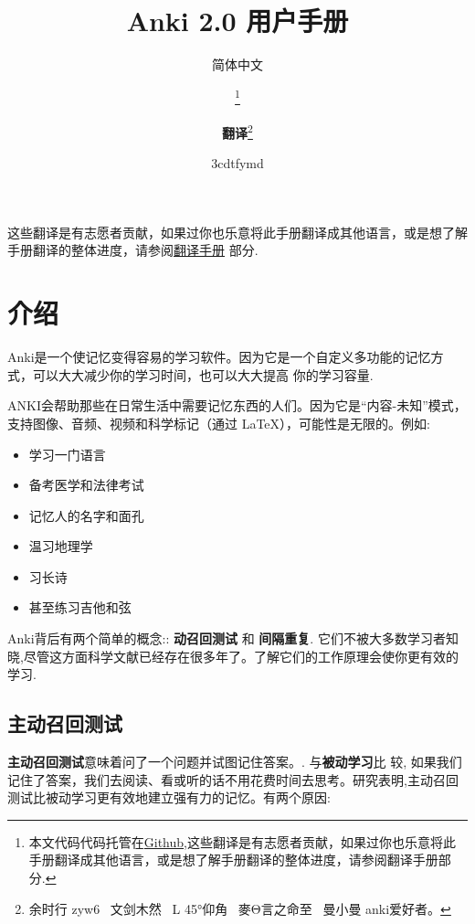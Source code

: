\documentclass[a4paper]{book}
\title{Anki 2.0 用户手册}
\author{简体中文}
\title{\textbf{\savedtitle}}
\author{\textbf{\savedauthor}\thanks{本文代码代码托管在\href{https://github.com/xiaoleeza/Ankihelp}{Github},这些翻译是有志愿者贡献，如果过你也乐意将此手册翻译成其他语言，或是想了解手册翻译的整体进度，请参阅翻译手册部分.}\and \textbf{翻译}\thanks{\ttfamily 余时行
		zyw6~
		文剑木然~
		L
		45°\hspace{-.1ex}仰角~
		麥\hspace{-.07ex}Θ\hspace{-.07ex}言之命至~
		曼小曼
		anki\hspace{-.07ex}爱好者。}}
\date{\w3cdtfymd}
\makeatletter
\let\savedauthor=\@author
\let\savedtitle=\@title
\newcounter{tab}[chapter]
\makeatother
\begin{document}
	\frontmatter
	\maketitle
	\thispagestyle{empty}
	\setcounter{tocdepth}{4}
	\tableofcontents\newpage\thispagestyle{empty}
	
	\mainmatter
	\fancyhf{}
	\fancyhead[LE]{{\small\leftmark}}
	\fancyhead[RO]{{\small\rightmark}}
	\fancyhead[RE,LO]{{\small\savedauthor\hspace*{1ex}\textbf{\savedtitle}}}
	\fancyfoot[LE,RO]{\small\textbf\thepage}
	\pagestyle{fancy}
	
	
	这些翻译是有志愿者贡献，如果过你也乐意将此手册翻译成其他语言，或是想了解手册翻译的整体进度，请参阅\hyperref[translatingmanual]{翻译手册} 部分.
	
	\chapter{介绍}
	
	Anki是一个使记忆变得容易的学习软件。因为它是一个自定义多功能的记忆方式，可以大大减少你的学习时间，也可以大大提高 你的学习容量.
	
	ANKI会帮助那些在日常生活中需要记忆东西的人们。因为它是“内容-未知”模式，支持图像、音频、视频和科学标记（通过 \LaTeX{}），可能性是无限的。例如:
	
	\begin{itemize}
		\itemsep1pt\parskip0pt
		\item 学习一门语言
		\item 备考医学和法律考试
		\item 记忆人的名字和面孔
		\item 温习地理学
		\item 习长诗
		\item 甚至练习吉他和弦
	\end{itemize}
	
	Anki背后有两个简单的概念:: \textbf{动召回测试 }和 \textbf{间隔重复}. 它们不被大多数学习者知晓,尽管这方面科学文献已经存在很多年了。了解它们的工作原理会使你更有效的学习.
	
	\section{主动召回测试}
	\textbf{主动召回测试}意味着问了一个问题并试图记住答案。. 与\textbf{被动学习}比 较, 如果我们记住了答案，我们去阅读、看或听的话不用花费时间去思考。研究表明,主动召回测试比被动学习更有效地建立强有力的记忆。有两个原因:
	
\end{document}
